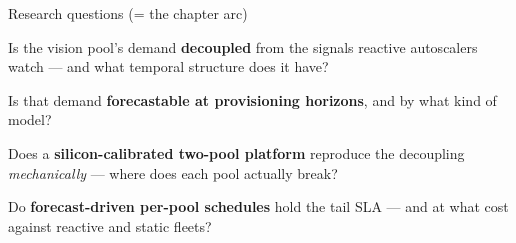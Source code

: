 \documentclass[11pt,aspectratio=169]{beamer}
\begin{document}
\begin{frame}{Research questions (= the chapter arc)}
  \begin{description}[<+->]
    \item[RQ1 --- Characterize.] Is the vision pool's demand \textbf{decoupled} from the
      signals reactive autoscalers watch --- and what temporal structure does it have?
    \item[RQ2 --- Forecast.] Is that demand \textbf{forecastable at provisioning
      horizons}, and by what kind of model?
    \item[RQ3 --- Model.] Does a \textbf{silicon-calibrated two-pool platform} reproduce
      the decoupling \emph{mechanically} --- where does each pool actually break?
    \item[RQ4 --- Close the loop.] Do \textbf{forecast-driven per-pool schedules} hold
      the tail SLA --- and at what cost against reactive and static fleets?
  \end{description}
\end{frame}
\end{document}
